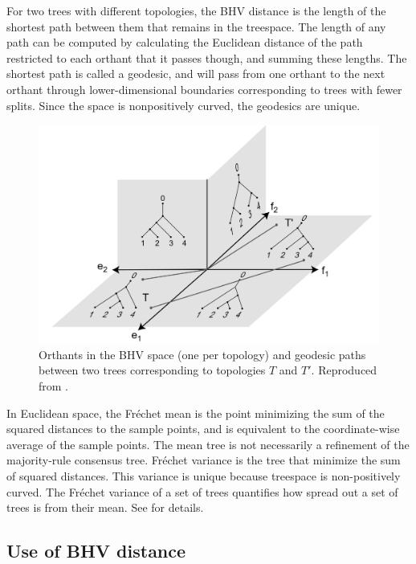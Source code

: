 For two trees with different topologies, the BHV distance is the length of the shortest path between them that remains in the treespace.  The length of any path can be computed by calculating the Euclidean distance of the path restricted to each orthant that it passes though, and summing these lengths.  The shortest path is called a geodesic, and will pass from one orthant to the next orthant through lower-dimensional boundaries corresponding to trees with fewer splits. Since the space is nonpositively  curved, the geodesics are unique. 

\begin{figure}
 \includegraphics{Figs/OrthantBHV}
 \caption{Orthants in the BHV space (one per topology) and geodesic paths between two trees corresponding to topologies $T$ and $T'$. Reproduced from \citet{Billera2001}.}
\end{figure}

In Euclidean space, the Fr\'echet mean is the point minimizing the sum of the squared distances to the sample points, and is equivalent to the coordinate-wise average of the sample points. The mean tree is not necessarily a refinement of the majority-rule consensus tree. Fr\'echet variance is the tree that minimize the sum of squared distances.  This variance is unique because treespace is non-positively curved. The Fr\'echet variance of a set of trees quantifies how spread out a set of trees is from their mean. See \cite{miller2015polyhedral,brown2017mean} for details.

\subsection{Use of BHV distance} \label{sec:means-and-variance}

